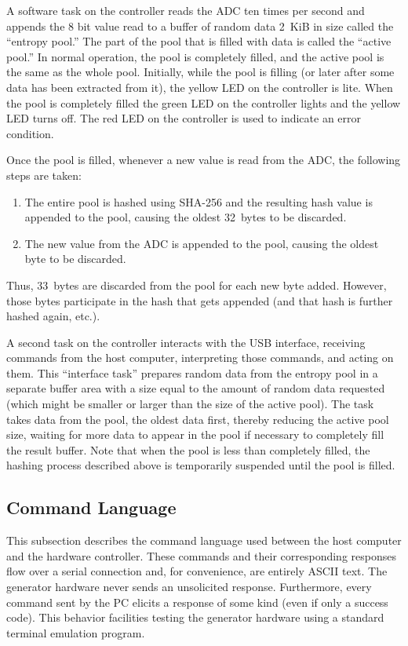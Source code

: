 A software task on the controller reads the ADC ten times per second and appends the 8 bit value
read to a buffer of random data 2~KiB in size called the ``entropy pool.'' The part of the pool
that is filled with data is called the ``active pool.'' In normal operation, the pool is
completely filled, and the active pool is the same as the whole pool. Initially, while the pool
is filling (or later after some data has been extracted from it), the yellow LED on the
controller is lite. When the pool is completely filled the green LED on the controller lights
and the yellow LED turns off. The red LED on the controller is used to indicate an error
condition.

Once the pool is filled, whenever a new value is read from the ADC, the following steps are
taken:

\begin{enumerate}
\item The entire pool is hashed using SHA-256 and the resulting hash value is appended to the
  pool, causing the oldest 32~bytes to be discarded.
\item The new value from the ADC is appended to the pool, causing the oldest byte to be
  discarded.
\end{enumerate}

Thus, 33~bytes are discarded from the pool for each new byte added. However, those bytes
participate in the hash that gets appended (and that hash is further hashed again, etc.).

A second task on the controller interacts with the USB interface, receiving commands from the
host computer, interpreting those commands, and acting on them. This ``interface task'' prepares
random data from the entropy pool in a separate buffer area with a size equal to the amount of
random data requested (which might be smaller or larger than the size of the active pool). The
task takes data from the pool, the oldest data first, thereby reducing the active pool size,
waiting for more data to appear in the pool if necessary to completely fill the result buffer.
Note that when the pool is less than completely filled, the hashing process described above is
temporarily suspended until the pool is filled.

\subsection{Command Language}

This subsection describes the command language used between the host computer and the hardware
controller. These commands and their corresponding responses flow over a serial connection and,
for convenience, are entirely ASCII text. The generator hardware never sends an unsolicited
response. Furthermore, every command sent by the PC elicits a response of some kind (even if
only a success code). This behavior facilities testing the generator hardware using a standard
terminal emulation program.

